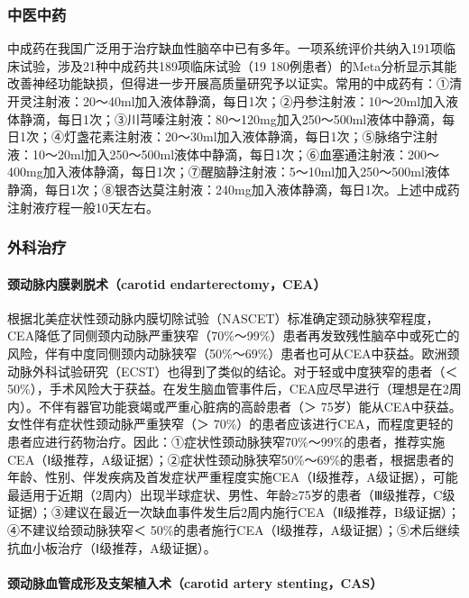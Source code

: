 \subsubsection{中医中药}

中成药在我国广泛用于治疗缺血性脑卒中已有多年。一项系统评价共纳入191项临床试验，涉及21种中成药共189项临床试验（19
180例患者）的Meta分析显示其能改善神经功能缺损，但得进一步开展高质量研究予以证实。常用的中成药有：①清开灵注射液：20～40ml加入液体静滴，每日1次；②丹参注射液：10～20ml加入液体静滴，每日1次；③川芎嗪注射液：80～120mg加入250～500ml液体中静滴，每日1次；④灯盏花素注射液：20～30ml加入液体静滴，每日1次；⑤脉络宁注射液：10～20ml加入250～500ml液体中静滴，每日1次；⑥血塞通注射液：200～400mg加入液体静滴，每日1次；⑦醒脑静注射液：5～10ml加入250～500ml液体静滴，每日1次；⑧银杏达莫注射液：240mg加入液体静滴，每日1次。上述中成药注射液疗程一般10天左右。

\subsubsection{外科治疗}

\paragraph{颈动脉内膜剥脱术（carotid endarterectomy，CEA）}

根据北美症状性颈动脉内膜切除试验（NASCET）标准确定颈动脉狭窄程度，CEA降低了同侧颈内动脉严重狭窄（70\%～99\%）患者再发致残性脑卒中或死亡的风险，伴有中度同侧颈内动脉狭窄（50\%～69\%）患者也可从CEA中获益。欧洲颈动脉外科试验研究（ECST）也得到了类似的结论。对于轻或中度狭窄的患者（＜
50\%），手术风险大于获益。在发生脑血管事件后，CEA应尽早进行（理想是在2周内）。不伴有器官功能衰竭或严重心脏病的高龄患者（＞
75岁）能从CEA中获益。女性伴有症状性颈动脉严重狭窄（＞
70\%）的患者应该进行CEA，而程度更轻的患者应进行药物治疗。因此：①症状性颈动脉狭窄70\%～99\%的患者，推荐实施CEA（Ⅰ级推荐，A级证据）；②症状性颈动脉狭窄50\%～69\%的患者，根据患者的年龄、性别、伴发疾病及首发症状严重程度实施CEA（Ⅰ级推荐，A级证据），可能最适用于近期（2周内）出现半球症状、男性、年龄≥75岁的患者（Ⅲ级推荐，C级证据）；③建议在最近一次缺血事件发生后2周内施行CEA（Ⅱ级推荐，B级证据）；④不建议给颈动脉狭窄＜
50\%的患者施行CEA（Ⅰ级推荐，A级证据）；⑤术后继续抗血小板治疗（Ⅰ级推荐，A级证据）。

\paragraph{颈动脉血管成形及支架植入术（carotid artery stenting，CAS）}

